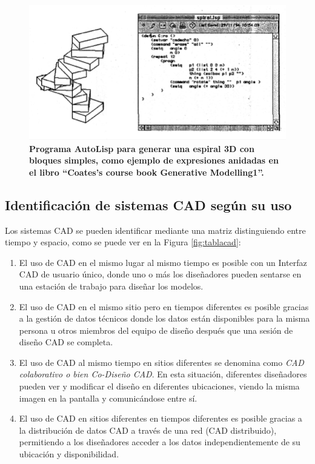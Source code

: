 \begin{figure}[h]
\includegraphics[width=14cm]{Img/CPD/cad-autolisp.png}
\centering
\caption{\textbf{\footnotesize{Programa AutoLisp para generar una espiral 3D con bloques simples, como
ejemplo de expresiones anidadas en el libro ``Coates's course book Generative Modelling1''. \citep{Celani2008}}}}
\end{figure}



\clearpage

\subsection{Identificación de sistemas CAD según su uso}
Los sistemas CAD se pueden identificar mediante una matriz distinguiendo entre tiempo y espacio\citep{Maher1997}, como se puede ver en la Figura \ref{fig:tablacad}:

\begin{enumerate}
\item El uso de CAD en el mismo lugar al mismo tiempo es posible con un Interfaz CAD de usuario único, donde uno o más los diseñadores pueden sentarse en una estación de trabajo para diseñar los modelos.
\item El uso de CAD en el mismo sitio pero en tiempos diferentes es posible gracias a la gestión de datos técnicos donde los datos están disponibles para la misma persona u otros miembros del equipo de diseño después que una sesión de diseño CAD se completa.
\item El uso de CAD al mismo tiempo en sitios diferentes se denomina como
\textit{CAD colaborativo o bien Co-Diseño CAD}. En esta situación, diferentes diseñadores pueden ver y modificar el diseño en diferentes ubicaciones, viendo la misma imagen en la pantalla y comunicándose entre sí.
\item El uso de CAD en sitios diferentes en tiempos diferentes es posible gracias a la distribución de datos CAD a través de una red (CAD distribuido), permitiendo a los diseñadores acceder a los datos independientemente de su ubicación y disponibilidad.
\end{enumerate}



